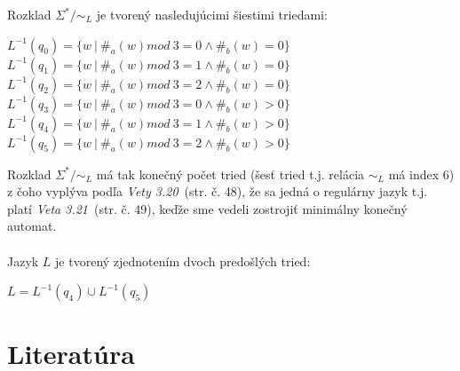 \documentclass[11pt,a4paper]{article}
\begin{document}
Rozklad $\Sigma^* / \sim_L$ je tvorený nasledujúcimi šiestimi triedami:

\begin{center}
$L^{-1}(q_0) = \{w\ |\ \#_a(w) mod\ 3 = 0 \wedge \#_b(w) = 0\}$\\
$L^{-1}(q_1) = \{w\ |\ \#_a(w) mod\ 3 = 1 \wedge \#_b(w) = 0\}$\\
$L^{-1}(q_2) = \{w\ |\ \#_a(w) mod\ 3 = 2 \wedge \#_b(w) = 0\}$\\
$L^{-1}(q_3) = \{w\ |\ \#_a(w) mod\ 3 = 0 \wedge \#_b(w) > 0\}$\\
$L^{-1}(q_4) = \{w\ |\ \#_a(w) mod\ 3 = 1 \wedge \#_b(w) > 0\}$\\
$L^{-1}(q_5) = \{w\ |\ \#_a(w) mod\ 3 = 2 \wedge \#_b(w) > 0\}$\\
\end{center}

Rozklad $\Sigma^* / \sim_L$ má tak konečný počet tried (šesť tried t.j. relácia $\sim_L$ má index 6) z čoho vyplýva podľa \textit{Vety 3.20}~\cite{TIN}(str. č. 48), že sa jedná o regulárny jazyk t.j. platí \textit{Veta 3.21}~\cite{TIN}(str. č. 49), keďže sme vedeli zostrojiť minimálny konečný automat.\\

\hfill\\

Jazyk $L$ je tvorený zjednotením dvoch predošlých tried:

\begin{center}
$L = L^{-1}(q_4) \cup L^{-1}(q_5)$\\
\end{center}

\newpage
\section{Literatúra}

\begin{flushleft}
    
\end{flushleft}
\end{document}
